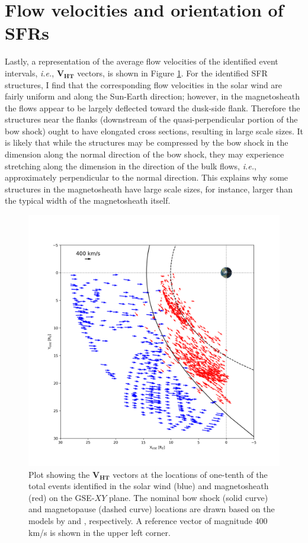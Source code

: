 \section{Flow velocities and orientation of SFRs}
Lastly, a representation of the average flow velocities of the identified event intervals, \textit{i.e.}, $\mathbf{V_{HT}}$ vectors, is shown in Figure \ref{fig:VHT-xy}. For the identified SFR structures, I find that the corresponding flow velocities in the solar wind are fairly uniform and along the Sun-Earth direction; however, in the magnetosheath the flows appear to be largely deflected toward the dusk-side flank. Therefore the structures near the flanks (downstream of the quasi-perpendicular portion of the bow shock) ought to have elongated cross sections, resulting in large scale sizes. It is likely that while the structures may be compressed by the bow shock in the dimension along the normal direction of the bow shock, they may experience stretching along the dimension in the direction of the bulk flows, \textit{i.e.}, approximately perpendicular to the normal direction. This explains why some structures in the magnetosheath have large scale sizes, for instance, larger than the typical width of the magnetosheath itself.

\begin{figure}
    \centering
    \includegraphics[width=\textwidth]{Figures/Orbits/VHT_xy.png}
    \caption[Orbit plot of flow vectors associated with the SFRs]{Plot showing the $\mathbf{V_{HT}}$ vectors at the locations of one-tenth of the total events identified in the solar wind (blue) and magnetosheath (red) on the GSE-$XY$ plane. The nominal bow shock (solid curve) and magnetopause (dashed curve) locations are drawn based on the models by \citet{Shue:1997} and \citet{SlavinHolzer:1984}, respectively. A reference vector of magnitude 400 km/s is shown in the upper left corner.}
    \label{fig:VHT-xy}
\end{figure}

